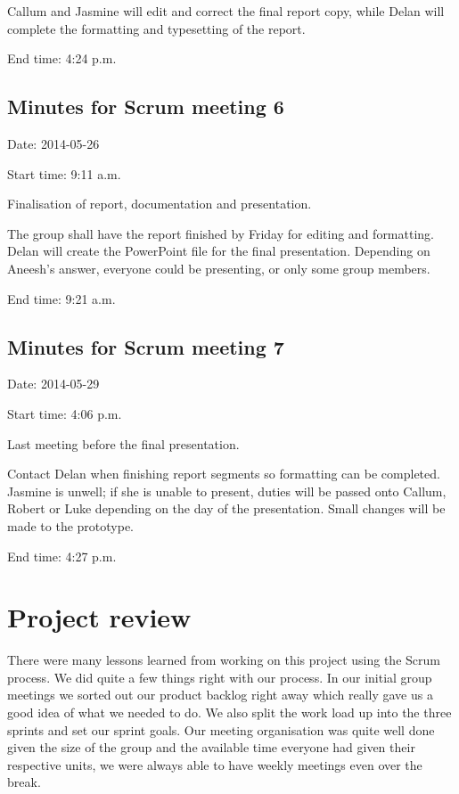 \documentclass[a4paper,titlepage,12pt]{article}
\let\stdsection\section
\renewcommand\section{\newpage\stdsection}
\begin{document}
Callum and Jasmine will edit and correct the final report copy, while Delan
will complete the formatting and typesetting of the report.

End time: 4:24 p.m.

\subsection{Minutes for Scrum meeting 6}

Date: 2014-05-26

Start time: 9:11 a.m.

Finalisation of report, documentation and presentation.

The group shall have the report finished by Friday for editing and formatting.
Delan will create the PowerPoint file for the final presentation. Depending on
Aneesh's answer, everyone could be presenting, or only some group members.

End time: 9:21 a.m.

\subsection{Minutes for Scrum meeting 7}

Date: 2014-05-29

Start time: 4:06 p.m.

Last meeting before the final presentation.

Contact Delan when finishing report segments so formatting can be completed.
Jasmine is unwell; if she is unable to present, duties will be passed onto
Callum, Robert or Luke depending on the day of the presentation. Small changes
will be made to the prototype.

End time: 4:27 p.m.

\section{Project review}

There were many lessons learned from working on this project using the Scrum
process. We did quite a few things right with our process. In our initial group
meetings we sorted out our product backlog right away which really gave us a
good idea of what we needed to do. We also split the work load up into the
three sprints and set our sprint goals. Our meeting organisation was quite well
done given the size of the group and the available time everyone had given
their respective units, we were always able to have weekly meetings even over
the break.
\end{document}
